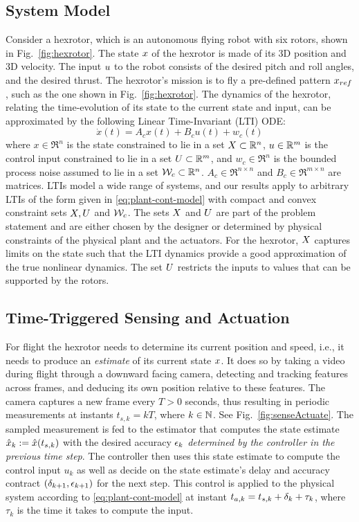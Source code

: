 \subsection{System Model}
\label{formulation}

Consider a hexrotor, which is an autonomous flying robot with six rotors, shown in Fig.~\ref{fig:hexrotor}.
The state $x$ of the hexrotor is made of its 3D position and 3D velocity.
The input $u$ to the robot consists of the desired pitch and roll angles, and the desired thrust.
The hexrotor's mission is to fly a pre-defined pattern $x_{ref}$, such as the one shown in Fig.~\ref{fig:hexrotor}.
The dynamics of the hexrotor, relating the time-evolution of its state to the current state and input, can be approximated by the following Linear Time-Invariant (LTI) ODE:
\begin{equation}
\dot{x}(t) = A_{c}x(t)+B_{c}u(t)+w_{c}(t)  \label{eq:plant-cont-model}
\end{equation}
where $x\in \Re^{n}$ is the state constrained to lie in a set $X \subset \mathbb{R}^n$,
$u\in\mathbb{R}^{m}$ is the control input constrained to lie in a set $U \subset \mathbb{R}^m$,
and $w_{c}\in\Re^{n}$ is the bounded process noise assumed to lie in a set $\mathcal{W}_c \subset \mathbb{R}^n$.
$A_c \in \Re^{n\times n}$ and $B_c \in \Re^{m\times n}$ are matrices.
LTIs model a wide range of systems, and our results apply to arbitrary LTIs of the form given in \eqref{eq:plant-cont-model} with compact and convex constraint sets $X,U$ and $\mathcal{W}_c$.
The sets $X$ and $U$ are part of the problem statement and are either chosen by the designer or determined by physical constraints of the physical plant and the actuators.
For the hexrotor, $X$ captures limits on the state such that the LTI dynamics provide a good approximation of the true nonlinear dynamics.
The set $U$ restricts the inputs to values that can be supported by the rotors.

\subsection{Time-Triggered Sensing and Actuation}
For flight the hexrotor needs to determine its current position and speed, i.e., it needs to produce an \emph{estimate} of its current state $x$.
It does so by taking a video during flight through a downward facing camera, detecting and tracking features across frames, and deducing its own position relative to these features.
The camera captures a new frame every $T > 0$ seconds, thus resulting in periodic measurements at instants $t_{s,k}=kT$,
where $k\in\mathbb{N}$.
See Fig.~\ref{fig:senseActuate}.
The sampled measurement is fed to the estimator that computes the state
estimate $\hat{x}_{k}:=\hat{x}(t_{s,k})$ with the desired
accuracy $\epsilon_k$ \emph{determined by the controller in the previous time step}.
The controller then uses this state estimate
to compute the control input $u_{k}$ as well as decide on the
state estimate's delay and accuracy contract $(\delta_{k+1},\epsilon_{k+1})$ for the next step.
This control is applied to the physical system according to \eqref{eq:plant-cont-model} at instant $t_{a,k} = t_{s,k}+\delta_k + \tau_k$, where $\tau_k$ is the time it takes to compute the input.

